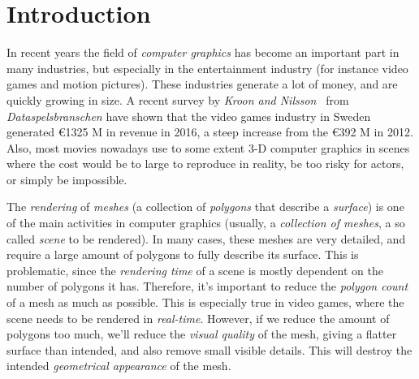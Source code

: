 

\chapter{Introduction}
\label{cha:introduction}

In recent years the field of \emph{computer graphics} has become an important part in many industries, but especially in the entertainment industry (for instance video games and motion pictures). These industries generate a lot of money, and are quickly growing in size. A recent survey by \emph{Kroon and Nilsson}~\cite{kroon2017game} from \emph{Dataspelsbranschen} have shown that the video games industry in Sweden generated \euro 1325 M in revenue in 2016, a steep increase from the \euro 392 M in 2012. Also, most movies nowadays use to some extent 3-D computer graphics in scenes where the cost would be to large to reproduce in reality, be too risky for actors, or simply be impossible.

The \emph{rendering} of \emph{meshes} (a collection of \emph{polygons} that describe a \emph{surface}) is one of the main activities in computer graphics (usually, a \emph{collection of meshes}, a so called \emph{scene} to be rendered). In many cases, these meshes are very detailed, and require a large amount of polygons to fully describe its surface. This is problematic, since the \emph{rendering time} of a scene is mostly dependent on the number of polygons it has. Therefore, it's important to reduce the \emph{polygon count} of a mesh as much as possible. This is especially true in video games, where the scene needs to be rendered in \emph{real-time}. However, if we reduce the amount of polygons too much, we'll reduce the \emph{visual quality} of the mesh, giving a flatter surface than intended, and also remove small visible details. This will destroy the intended \emph{geometrical appearance} of the mesh.

